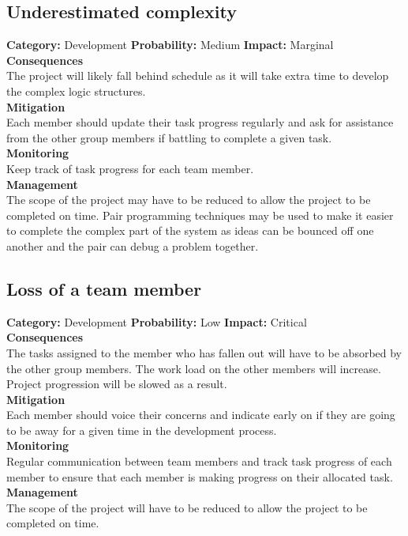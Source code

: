 \documentclass[a4paper,10pt]{article}
\begin{document}
		\subsection{Underestimated complexity}
		\textbf{Category:} Development\newline
		\textbf{Probability:} Medium\newline
		\textbf{Impact:} Marginal
		\\\textbf{Consequences}\\
		The project will likely fall behind schedule as it will take extra time to develop the complex logic structures.
		\smallskip\\\textbf{Mitigation}\\
		Each member should update their task progress regularly and ask for assistance from the other group members if battling to complete a given task.
		\smallskip\\\textbf{Monitoring}\\
		Keep track of task progress for each team member.
		\smallskip\\\textbf{Management}\\
		The scope of the project may have to be reduced to allow the project to be completed on time. Pair programming techniques may be used to make it easier to complete the complex part of the system as ideas can be bounced off one another and the pair can debug a problem together.

		\subsection{Loss of a team member}
		\textbf{Category:} Development\newline
		\textbf{Probability:} Low\newline
		\textbf{Impact:} Critical
		\\\textbf{Consequences}\\
		The tasks assigned to the member who has fallen out will have to be absorbed by the other group members. The work load on the other members will increase. Project progression will be slowed as a result.
		\smallskip\\\textbf{Mitigation}\\
		Each member should voice their concerns and indicate early on if they are going to be away for a given time in the development process.
		\smallskip\\\textbf{Monitoring}\\
		Regular communication between team members and track task progress of each member to ensure that each member is making progress on their allocated task.
		\smallskip\\\textbf{Management}\\
		The scope of the project will have to be reduced to allow the project to be completed on time.
\end{document}
